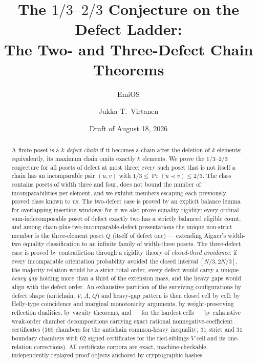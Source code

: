 \documentclass[11pt]{article}
\title{The $1/3$--$2/3$ Conjecture on the Defect Ladder:\\
The Two- and Three-Defect Chain Theorems}
\author{EmiOS \and Jukka T.~Virtanen}
\date{Draft of August 18, 2026}
\theoremstyle{definition}
\theoremstyle{remark}
\newcommand{\pr}{\operatorname{Pr}}
\begin{document}
\maketitle

\begin{abstract}
A finite poset is a \emph{$k$-defect chain} if it becomes a chain after the deletion of
$k$ elements; equivalently, its maximum chain omits exactly $k$ elements. We prove the
$1/3$--$2/3$ conjecture for all posets of defect at most three: every such poset that is
not itself a chain has an incomparable pair $(u,v)$ with $1/3\le\pr(u\prec v)\le 2/3$.
The class contains posets of width three and four, does not bound the number of
incomparabilities per element, and we exhibit members escaping each previously proved
class known to us. The two-defect case is proved by an explicit balance lemma for
overlapping insertion windows; for it we also prove equality rigidity: every
ordinal-sum-indecomposable poset of defect exactly two has a strictly balanced eligible
count, and among chain-plus-two-incomparable-defect presentations the unique non-strict
member is the three-element poset $Q$ (itself of defect one) --- extending Aigner's
width-two equality classification to an infinite family of width-three posets. The
three-defect case is proved by contradiction through a rigidity theory of \emph{closed-third
avoidance}: if every incomparable orientation probability avoided the closed interval
$[N/3,2N/3]$, the majority relation would be a strict total order, every defect would
carry a unique \emph{heavy gap} holding more than a third of the extension mass, and the
heavy gaps would align with the defect order. An exhaustive partition of the surviving
configurations by defect shape (antichain, $V$, $\Lambda$, $Q$) and heavy-gap pattern is
then closed cell by cell: by Helly-type coincidence and marginal monotonicity arguments,
by weight-preserving reflection dualities, by vacuity theorems, and --- for the hardest
cells --- by exhaustive weak-order chamber decompositions carrying exact rational
nonnegative-coefficient certificates ($169$ chambers for the antichain common-heavy
inequality; $31$ strict and $31$ boundary chambers with $62$ signed certificates for the
tied-siblings $V$ cell and its one-relation corrections). All certificate corpora are
exact, machine-checkable, independently replayed proof objects anchored by cryptographic
hashes.
\end{abstract}
\end{document}
